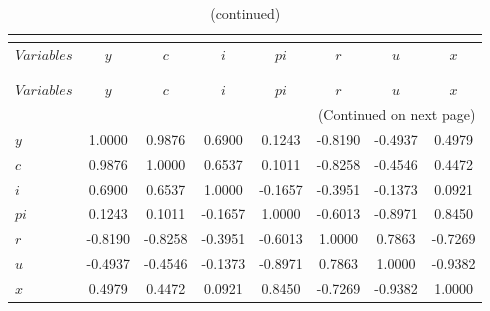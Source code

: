  
\begin{center}
\begin{longtable}{lccccccc} 
\caption{MATRIX OF CORRELATIONS}\\
 \label{Table:th_corr_matrix}\\
\toprule 
$Variables  $	 & 	 $          y$	 & 	 $          c$	 & 	 $          i$	 & 	 $         pi$	 & 	 $          r$	 & 	 $          u$	 & 	 $          x$\\
\midrule \endfirsthead 
\caption{(continued)}\\
 \toprule \\ 
$Variables  $	 & 	 $          y$	 & 	 $          c$	 & 	 $          i$	 & 	 $         pi$	 & 	 $          r$	 & 	 $          u$	 & 	 $          x$\\
\midrule \endhead 
\midrule \multicolumn{8}{r}{(Continued on next page)} \\ \bottomrule \endfoot 
\bottomrule \endlastfoot 
$y          $	 & 	     1.0000	 & 	     0.9876	 & 	     0.6900	 & 	     0.1243	 & 	    -0.8190	 & 	    -0.4937	 & 	     0.4979 \\ 
$c          $	 & 	     0.9876	 & 	     1.0000	 & 	     0.6537	 & 	     0.1011	 & 	    -0.8258	 & 	    -0.4546	 & 	     0.4472 \\ 
$i          $	 & 	     0.6900	 & 	     0.6537	 & 	     1.0000	 & 	    -0.1657	 & 	    -0.3951	 & 	    -0.1373	 & 	     0.0921 \\ 
$pi         $	 & 	     0.1243	 & 	     0.1011	 & 	    -0.1657	 & 	     1.0000	 & 	    -0.6013	 & 	    -0.8971	 & 	     0.8450 \\ 
$r          $	 & 	    -0.8190	 & 	    -0.8258	 & 	    -0.3951	 & 	    -0.6013	 & 	     1.0000	 & 	     0.7863	 & 	    -0.7269 \\ 
$u          $	 & 	    -0.4937	 & 	    -0.4546	 & 	    -0.1373	 & 	    -0.8971	 & 	     0.7863	 & 	     1.0000	 & 	    -0.9382 \\ 
$x          $	 & 	     0.4979	 & 	     0.4472	 & 	     0.0921	 & 	     0.8450	 & 	    -0.7269	 & 	    -0.9382	 & 	     1.0000 \\ 
\end{longtable}
 \end{center}
